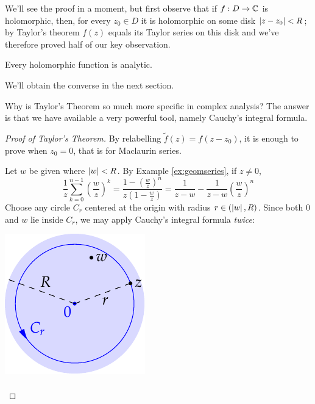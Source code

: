 We'll see the proof in a moment, but first observe that if $f:D\to\mathbb{C}$ is holomorphic, then, for every $z_0\in D$ it is holomorphic on some disk $\left| z-z_0\right|<R$; by Taylor's theorem $f(z)$ equals its Taylor series on this disk and we've therefore proved half of our key observation.

\begin{cor}{}{}
	Every holomorphic function is analytic.
\end{cor}

We'll obtain the converse in the next section.\medbreak



Why is Taylor's Theorem so much more specific in complex analysis? The answer is that we have available a very powerful tool, namely Cauchy's integral formula.

\begin{proof}[Proof of Taylor's Theorem]
By relabelling $\tilde f(z)=f(z-z_0)$, it is enough to prove when $z_0=0$, that is for Maclaurin series.\par
\begin{minipage}[t]{0.7\linewidth}\vspace{-2pt}
Let $w$ be given where $\left| w\right|<R$. By Example \ref{ex:geomseries}, if $z\neq 0$,
\[
\frac 1z\sum_{k=0}^{n-1}\left(\frac wz\right)^k=\frac{1-\left(\frac wz\right)^n}{z(1-\frac wz)} =\frac 1{z-w}-\frac 1{z-w}\left(\frac wz\right)^n\tag{$\ast$}
\]
Choose any circle $C_r$ centered at the origin with radius $r\in(\left| w\right|,R)$. Since both $0$ and $w$ lie inside $C_r$, we may apply Cauchy's integral formula \emph{twice}:
\end{minipage}\begin{minipage}[t]{0.3\linewidth}\vspace{-2pt}
\flushright\includegraphics{taylor}
\end{minipage}\par
\vspace{-10pt}
\begin{align*}

\end{align*}
\end{proof}
